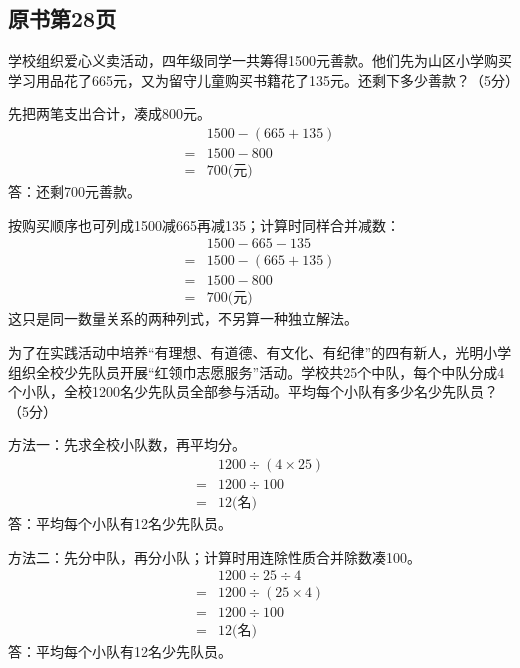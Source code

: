 

\subsection*{原书第28页}

学校组织爱心义卖活动，四年级同学一共筹得1500元善款。他们先为山区小学购买学习用品花了665元，又为留守儿童购买书籍花了135元。还剩下多少善款？（5分）\par
\begin{BookAnswer}
先把两笔支出合计，凑成800元。\[\begin{aligned}&1500-(665+135)\\={}&1500-800\\={}&700\text{(元)}\end{aligned}\]答：还剩700元善款。\par 按购买顺序也可列成1500减665再减135；计算时同样合并减数：\[\begin{aligned}&1500-665-135\\={}&1500-(665+135)\\={}&1500-800\\={}&700\text{(元)}\end{aligned}\]这只是同一数量关系的两种列式，不另算一种独立解法。
\end{BookAnswer}

为了在实践活动中培养“有理想、有道德、有文化、有纪律”的四有新人，光明小学组织全校少先队员开展“红领巾志愿服务”活动。学校共25个中队，每个中队分成4个小队，全校1200名少先队员全部参与活动。平均每个小队有多少名少先队员？（5分）\par
\begin{BookAnswer}
方法一：先求全校小队数，再平均分。\[\begin{aligned}&1200\div(4\times25)\\={}&1200\div100\\={}&12\text{(名)}\end{aligned}\]答：平均每个小队有12名少先队员。\par 方法二：先分中队，再分小队；计算时用连除性质合并除数凑100。\[\begin{aligned}&1200\div25\div4\\={}&1200\div(25\times4)\\={}&1200\div100\\={}&12\text{(名)}\end{aligned}\]答：平均每个小队有12名少先队员。
\end{BookAnswer}

